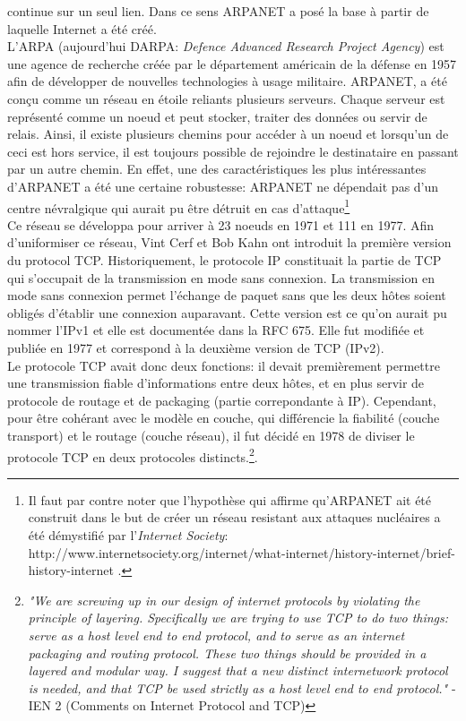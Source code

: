 continue sur un seul lien. Dans ce sens ARPANET a posé la base à partir de 
laquelle Internet a été créé. 
\\
L'ARPA (aujourd'hui DARPA: {\it Defence Advanced Research Project Agency}) est
une agence de recherche créée par le département américain de la défense en
1957 afin de développer de nouvelles technologies à usage militaire. ARPANET,
a été conçu comme un réseau en étoile reliants plusieurs serveurs.
Chaque serveur est représenté comme un noeud et peut stocker, traiter des données ou servir de relais.
Ainsi, il existe plusieurs chemins pour accéder à un noeud et lorsqu'un de ceci
est hors service, il est toujours possible de rejoindre le destinataire
en passant par un autre chemin. En effet, une des caractéristiques les plus intéressantes
d'ARPANET a été une certaine robustesse: ARPANET ne dépendait pas d'un centre
névralgique qui aurait pu être détruit en cas d'attaque\footnote { Il faut par
contre noter que l'hypothèse qui affirme qu'ARPANET ait été construit dans le
but de créer un réseau resistant aux attaques nucléaires a été démystifié par
l'{\it Internet Society}:
http://www.internetsociety.org/internet/what-internet/history-internet/brief-history-internet
.}
\\
Ce réseau se développa pour arriver à 23 noeuds en 1971 et 111 en 1977.
Afin d'uniformiser ce réseau, Vint Cerf et Bob Kahn ont introduit la première
version du protocol TCP.  Historiquement, le protocole IP constituait la
partie de TCP qui s'occupait de la transmission en mode sans connexion.
La transmission en mode sans connexion permet l'échange de paquet sans que les
deux hôtes soient obligés d'établir une connexion auparavant.
Cette version est ce qu'on aurait pu nommer l'IPv1 et elle est documentée dans
la RFC 675. Elle fut modifiée et publiée en 1977 et correspond à la
deuxième version de TCP (IPv2). 
\\
Le protocole TCP avait donc deux fonctions: il devait premièrement
permettre une transmission fiable d'informations entre deux hôtes, et en plus
servir de protocole de routage et de packaging (partie correpondante à IP).
Cependant, pour être cohérant avec le modèle en couche, qui différencie la fiabilité
(couche transport) et le routage (couche réseau), il fut décidé en 1978 de
diviser le protocole TCP en deux protocoles distincts.\footnote {
{\it "We are screwing up in our design of internet protocols by violating the
principle of layering. Specifically we are trying to use TCP to do two
things: serve as a host level end to end protocol, and to serve as an
internet packaging and routing protocol. These two things should be
provided in a layered and modular way. I suggest that a new distinct
internetwork protocol is needed, and that TCP be used strictly as a host
level end to end protocol." } - IEN 2 (Comments on Internet Protocol and TCP)
}.

